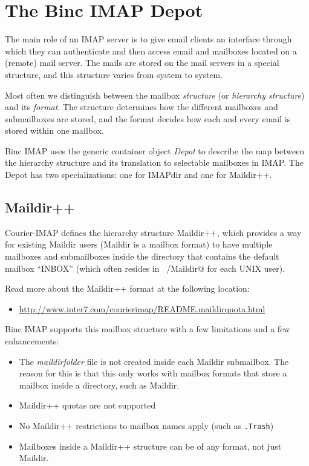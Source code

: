 \documentclass[11pt,a4paper,twoside,openright]{report}
\begin{document}
\chapter{The Binc IMAP Depot}

The main role of an IMAP server is to give email clients an interface
through which they can authenticate and then access email and
mailboxes located on a (remote) mail server. The mails are stored on
the mail servers in a special structure, and this structure varies
from system to system.

Most often we distinguish between the mailbox \textit{structure} (or
\textit{hierarchy structure}) and its \textit{format}. The structure
determines how the different mailboxes and submailboxes are stored,
and the format decides how each and every email is stored within one
mailbox.

Binc IMAP uses the generic container object \textit{Depot} to describe
the map between the hierarchy structure and its translation to
selectable mailboxes in IMAP. The Depot has two specializations: one
for IMAPdir and one for Maildir++.

\section{Maildir++}

Courier-IMAP defines the hierarchy structure Maildir++, which provides
a way for existing Maildir users (Maildir is a mailbox format) to have
multiple mailboxes and submailboxes inside the directory that contains
the default mailbox ``INBOX'' (which often resides in \Verb@~/Maildir@
for each UNIX user).

Read more about the Maildir++ format at the following location:

\begin{itemize}
\item [] \url{http://www.inter7.com/courierimap/README.maildirquota.html}
\end{itemize}

Binc IMAP supports this mailbox structure with a few limitations and a
few enhancements:

\begin{itemize}
\item The \textit{maildirfolder} file is not created inside each
Maildir submailbox. The reason for this is that this only works with
mailbox formats that store a mailbox inside a directory, such as
Maildir.
\item Maildir++ quotas are not supported
\item No Maildir++ restrictions to mailbox names apply (such as
\texttt{.Trash})
\item Mailboxes inside a Maildir++ structure can be of any format, not
just Maildir.
\end{itemize}
\end{document}

